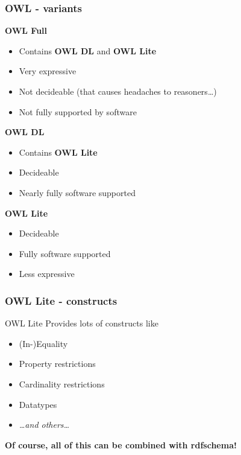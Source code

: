 \documentclass[handout]{beamer}
\begin{document}
       \begin{frame}
           \frametitle{OWL - variants}

           \textbf{OWL Full}\\
           \begin{itemize}
               \item Contains \textbf{OWL DL} and \textbf{OWL Lite}
               \item Very expressive
               \item Not decideable (that causes headaches to reasoners\ldots)
               \item Not fully supported by software
           \end{itemize}
           \pause
           \textbf{OWL DL}
           \begin{itemize}
               \item Contains \textbf{OWL Lite}
               \item Decideable
               \item Nearly fully software supported
           \end{itemize}
           \pause
           \textbf{OWL Lite}
           \begin{itemize}
               \item Decideable
               \item Fully software supported
               \item Less expressive
           \end{itemize}
       \end{frame}

       \begin{frame}
           \frametitle{OWL Lite - constructs}

           OWL Lite Provides lots of constructs like
           \vskip 0.7cm
           \begin{itemize}           
               \item (In-)Equality
               \item Property restrictions
               \item Cardinality restrictions
               \item Datatypes
               \item \textit{\ldots and others\ldots}
           \end{itemize}
           \vskip 0.7cm
           \textbf{Of course, all of this can be combined with rdfschema!}
       \end{frame}
\end{document}
